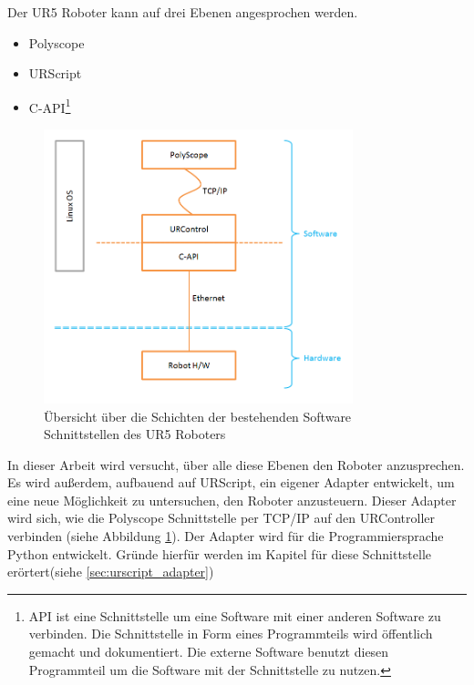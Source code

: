 Der UR5 Roboter kann auf drei Ebenen angesprochen werden.\\

\begin{itemize}
\item Polyscope
\item URScript
\item C-API\footnote{\ac{API} ist eine Schnittstelle um eine Software mit einer anderen Software zu verbinden. Die Schnittstelle in Form eines Programmteils wird öffentlich gemacht und dokumentiert. Die externe Software benutzt diesen Programmteil um die Software mit der Schnittstelle zu nutzen.}
\end{itemize}

\begin{figure}[H]
  \centering
    \includegraphics[width=0.8\textwidth]{pic/ur_programming_levels.png}
      \caption[Schichten der Software Schnittstellen]{Übersicht über die
      Schichten der bestehenden Software Schnittstellen des UR5 Roboters}
      \label{fig:schnittstellen_schichten}
\end{figure}

In dieser Arbeit wird versucht, über alle diese Ebenen den Roboter anzusprechen.
Es wird außerdem, aufbauend auf URScript, ein eigener Adapter entwickelt, um eine neue Möglichkeit zu untersuchen, den Roboter anzusteuern. Dieser Adapter wird sich, wie die Polyscope Schnittstelle per \ac{TCP/IP} auf den URController verbinden (siehe Abbildung \ref{fig:schnittstellen_schichten}).
Der Adapter wird für die Programmiersprache Python entwickelt. Gründe hierfür werden im Kapitel für diese Schnittstelle erörtert(siehe \ref{sec:urscript_adapter})

